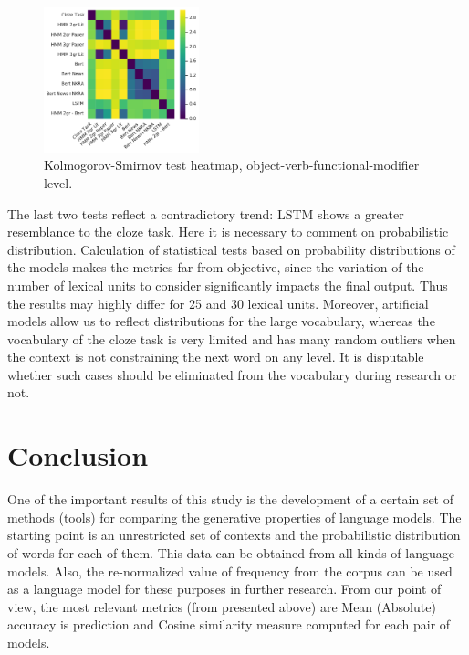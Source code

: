 \documentclass[a4paper]{article}
\begin{document}
\begin{figure}
\label{fig:heatmap-ks-ovfm}
\caption{Kolmogorov-Smirnov test heatmap, object-verb-functional-modifier level.}
\centering
\includegraphics[width=0.4\textwidth]{figures/pdf/ks-omvf.pdf}
\end{figure}

The last two tests reflect a contradictory trend: LSTM shows a greater resemblance to the cloze task. Here it is necessary to comment on probabilistic distribution. Calculation of statistical tests based on probability distributions of the models makes the metrics far from objective, since the variation of the number of lexical units to consider significantly impacts the final output. Thus the results may highly differ for 25 and 30 lexical units. Moreover, artificial models allow us to reflect distributions for the large vocabulary, whereas the vocabulary of the cloze task is very limited and has many random outliers when the context is not constraining the next word on any level. It is disputable whether such cases should be eliminated from the vocabulary during research or not.

\section{Conclusion}
One of the important results of this study is the development of a certain set of methods (tools) for comparing the generative properties of language models. The starting point is an unrestricted set of contexts and the probabilistic distribution of words for each of them. This data can be obtained from all kinds of language models. Also, the re-normalized value of frequency from the corpus can be used as a language model for these purposes in further research. From our point of view, the most relevant metrics (from presented above) are Mean (Absolute) accuracy is prediction
and Cosine similarity measure computed for each pair of models.  
\end{document}
